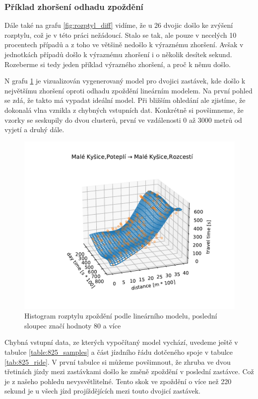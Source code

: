 \subsubsection{Příklad zhoršení odhadu zpoždění}




Dále také na grafu \ref{fig:rozptyl_diff} vidíme, že u 26 dvojic došlo ke zvýšení rozptylu, což je v této práci nežádoucí. Stalo se tak, ale pouze v necelých 10 procentech případů a z toho ve většině nedošlo k výraznému zhoršení. Avšak v jednotkách případů došlo k výraznému zhoršení i o několik desítek sekund. Rozeberme si tedy jeden příklad výrazného zhoršení, a proč k němu došlo.


\bigbreak


N grafu \ref{fig:chyba} je vizualizován vygenerovaný model pro dvojici zastávek, kde došlo k největšímu zhoršení oproti odhadu zpoždění lineárním modelem. Na první pohled se zdá, že takto má vypadat ideální model. Při bližším ohledání ale zjistíme, že dokonalá vlna vznikla z chybných vstupních dat. Konkrétně si povšimneme, že vzorky se seskupily do dvou clusterů, první ve vzdálenosti 0 až 3000 metrů od vyjetí a druhý dále.


\begin{figure}
   \centering
 \includegraphics[width=1\linewidth]{../img/chyba}
 \caption{Histogram rozptylu zpoždění podle lineárního modelu, poslední sloupec značí hodnoty 80 a více}
 \label{fig:chyba}
\end{figure}


Chybná vstupní data, ze kterých vypočítaný model vychází, uvedeme ještě v tabulce \ref{table:825_samples} a část jízdního řádu dotčeného spoje v tabulce \ref{tab:825_ride}. V první tabulce si můžeme povšimnout, že zhruba ve dvou třetinách jízdy mezi zastávkami došlo ke změně zpoždění v poslední zastávce. Což je z našeho pohledu nevysvětlitelné. Tento skok ve zpoždění o více než 220 sekund je u všech jízd projíždějících mezi touto dvojicí zastávek.


